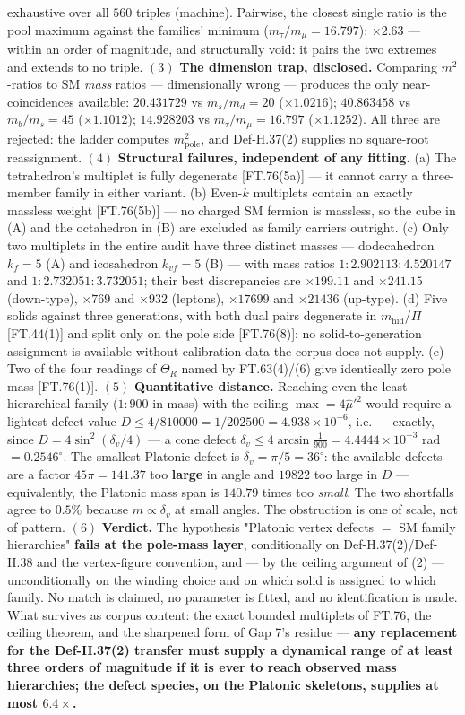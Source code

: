 \documentclass[11pt,openany]{report}
\theoremstyle{canonplain}
\theoremstyle{canondef}
\begin{document}
exhaustive over all $560$ triples (machine). Pairwise, the closest single ratio is the pool maximum against the families' minimum ($m_\tau/m_\mu=16.797$): $\times2.63$ — within an order of magnitude, and structurally void: it pairs the two extremes and extends to no triple. $(3)$ \textbf{The dimension trap, disclosed.} Comparing $m^2$-ratios to SM \textit{mass} ratios — dimensionally wrong — produces the only near-coincidences available: $20.431729$ vs $m_s/m_d=20$ ($\times1.0216$); $40.863458$ vs $m_b/m_s=45$ ($\times1.1012$); $14.928203$ vs $m_\tau/m_\mu=16.797$ ($\times1.1252$). All three are rejected: the ladder computes $m^2_{\mathrm{pole}}$, and Def-H.37(2) supplies no square-root reassignment. $(4)$ \textbf{Structural failures, independent of any fitting.} (a) The tetrahedron's multiplet is fully degenerate [FT.76(5a)] — it cannot carry a three-member family in either variant. (b) Even-$k$ multiplets contain an exactly massless weight [FT.76(5b)] — no charged SM fermion is massless, so the cube in (A) and the octahedron in (B) are excluded as family carriers outright. (c) Only two multiplets in the entire audit have three distinct masses — dodecahedron $k_f=5$ (A) and icosahedron $k_{vf}=5$ (B) — with mass ratios $1{:}2.902113{:}4.520147$ and $1{:}2.732051{:}3.732051$; their best discrepancies are $\times199.11$ and $\times241.15$ (down-type), $\times769$ and $\times932$ (leptons), $\times17699$ and $\times21436$ (up-type). (d) Five solids against three generations, with both dual pairs degenerate in $m_{\mathrm{hid}}$/$\Pi$ [FT.44(1)] and split only on the pole side [FT.76(8)]: no solid-to-generation assignment is available without calibration data the corpus does not supply. (e) Two of the four readings of $\Theta_R$ named by FT.63(4)/(6) give identically zero pole mass [FT.76(1)]. $(5)$ \textbf{Quantitative distance.} Reaching even the least hierarchical family ($1{:}900$ in mass) with the ceiling $\max=4\hat\mu'^2$ would require a lightest defect value $D\le4/810000=1/202500=4.938\times10^{-6}$, i.e. — exactly, since $D=4\sin^2(\delta_v/4)$ — a cone defect $\delta_v\le4\arcsin\tfrac1{900}=4.4444\times10^{-3}$ rad $=0.2546^\circ$. The smallest Platonic defect is $\delta_v=\pi/5=36^\circ$: the available defects are a factor $45\pi=141.37$ too \textbf{large} in angle and $19822$ too large in $D$ — equivalently, the Platonic mass span is $140.79$ times too \textit{small}. The two shortfalls agree to $0.5\%$ because $m\propto\delta_v$ at small angles. The obstruction is one of scale, not of pattern. $(6)$ \textbf{Verdict.} The hypothesis "Platonic vertex defects $=$ SM family hierarchies" \textbf{fails at the pole-mass layer}, conditionally on Def-H.37(2)/Def-H.38 and the vertex-figure convention, and — by the ceiling argument of (2) — unconditionally on the winding choice and on which solid is assigned to which family. No match is claimed, no parameter is fitted, and no identification is made. What survives as corpus content: the exact bounded multiplets of FT.76, the ceiling theorem, and the sharpened form of Gap 7's residue — \textbf{any replacement for the Def-H.37(2) transfer must supply a dynamical range of at least three orders of magnitude if it is ever to reach observed mass hierarchies; the defect species, on the Platonic skeletons, supplies at most $6.4\times$.}
\end{document}
